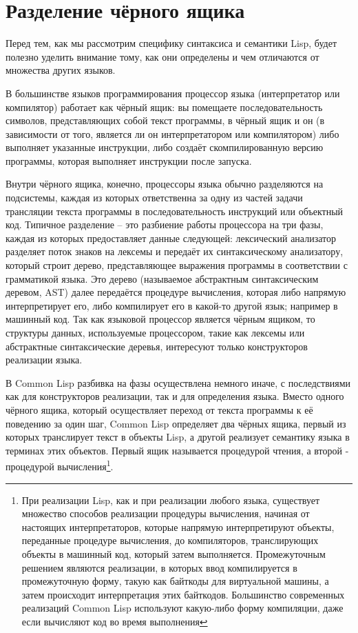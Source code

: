 \section{Разделение чёрного ящика}

Перед тем, как мы рассмотрим специфику синтаксиса и семантики Lisp, будет полезно уделить
внимание тому, как они определены и чем отличаются от множества других языков.

В большинстве языков программирования процессор языка (интерпретатор или компилятор)
работает как чёрный ящик: вы помещаете последовательность символов, представляющих собой
текст программы, в чёрный ящик и он (в зависимости от того, является ли он интерпретатором
или компилятором) либо выполняет указанные инструкции, либо создаёт скомпилированную
версию программы, которая выполняет инструкции после запуска.

Внутри чёрного ящика, конечно, процессоры языка обычно разделяются на подсистемы, каждая
из которых ответственна за одну из частей задачи трансляции текста программы в
последовательность инструкций или объектный код. Типичное разделение -- это разбиение
работы процессора на три фазы, каждая из которых предоставляет данные следующей:
лексический анализатор разделяет поток знаков на лексемы и передаёт их синтаксическому
анализатору, который строит дерево, представляющее выражения программы в соответствии с
грамматикой языка. Это дерево (называемое абстрактным синтаксическим деревом, AST) далее
передаётся процедуре вычисления, которая либо напрямую интерпретирует его, либо
компилирует его в какой-то другой язык; например в машинный код. Так как языковой
процессор является чёрным ящиком, то структуры данных, используемые процессором, такие как
лексемы или абстрактные синтаксические деревья, интересуют только конструкторов реализации
языка.

В Common Lisp разбивка на фазы осуществлена немного иначе, с последствиями как для
конструкторов реализации, так и для определения языка. Вместо одного чёрного ящика,
который осуществляет переход от текста программы к её поведению за один шаг, Common Lisp
определяет два чёрных ящика, первый из которых транслирует текст в объекты Lisp, а другой
реализует семантику языка в терминах этих объектов. Первый ящик называется процедурой
чтения, а второй - процедурой вычисления\footnote{При реализации Lisp, как и при
  реализации любого языка, существует множество способов реализации процедуры вычисления,
  начиная от настоящих интерпретаторов, которые напрямую интерпретируют объекты,
  переданные процедуре вычисления, до компиляторов, транслирующих объекты в машинный код,
  который затем выполняется. Промежуточным решением являются реализации, в которых ввод
  компилируется в промежуточную форму, такую как байткоды для виртуальной машины, а затем
  происходит интерпретация этих байткодов. Большинство современных реализаций Common Lisp
  используют какую-либо форму компиляции, даже если вычисляют код во время выполнения}.

